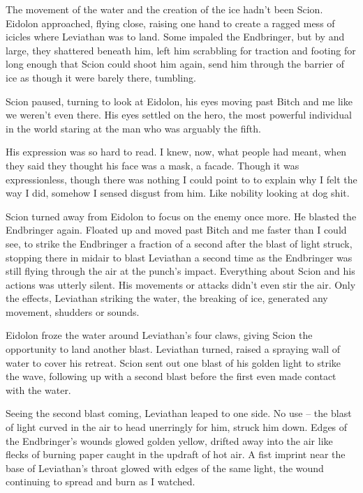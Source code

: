 The movement of the water and the creation of the ice hadn't been Scion.  Eidolon approached, flying close, raising one hand to create a ragged mess of icicles where Leviathan was to land.  Some impaled the Endbringer, but by and large, they shattered beneath him, left him scrabbling for traction and footing for long enough that Scion could shoot him again, send him through the barrier of ice as though it were barely there, tumbling.



Scion paused, turning to look at Eidolon, his eyes moving past Bitch and me like we weren't even there.  His eyes settled on the hero, the most powerful individual in the world staring at the man who was arguably the fifth.



His expression was so hard to read.  I knew, now, what people had meant, when they said they thought his face was a mask, a facade.  Though it was expressionless, though there was nothing I could point to to explain why I felt the way I did, somehow I sensed disgust from him.  Like nobility looking at dog shit.



Scion turned away from Eidolon to focus on the enemy once more.  He blasted the Endbringer again.  Floated up and moved past Bitch and me faster than I could see, to strike the Endbringer a fraction of a second after the blast of light struck, stopping there in midair to blast Leviathan a second time as the Endbringer was still flying through the air at the punch's impact.  Everything about Scion and his actions was utterly silent. His movements or attacks didn't even stir the air.  Only the effects, Leviathan striking the water, the breaking of ice, generated any movement, shudders or sounds.



Eidolon froze the water around Leviathan's four claws, giving Scion the opportunity to land another blast.  Leviathan turned, raised a spraying wall of water to cover his retreat.  Scion sent out one blast of his golden light to strike the wave, following up with a second blast before the first even made contact with the water.



Seeing the second blast coming, Leviathan leaped to one side.  No use – the blast of light curved in the air to head unerringly for him, struck him down.  Edges of the Endbringer's wounds glowed golden yellow, drifted away into the air like flecks of burning paper caught in the updraft of hot air.  A fist imprint near the base of Leviathan's throat glowed with edges of the same light, the wound continuing to spread and burn as I watched.



